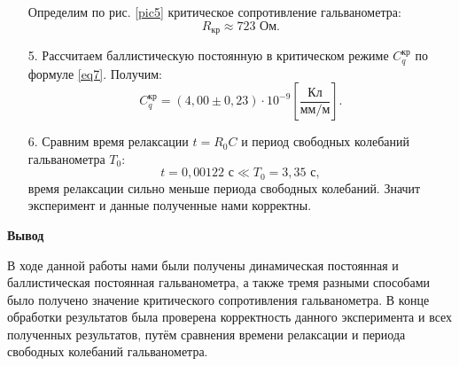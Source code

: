 \documentclass[a4paper, 12pt]{article}
\begin{document}
\begin{enumerate}
        \newpage
        
        Определим по рис. \ref{pic5} критическое сопротивление гальванометра:
        \begin{equation}
            R_{кр} \approx 723 \text{ Ом}.
        \end{equation}
        
        \item[5.] Рассчитаем баллистическую постоянную в критическом режиме $C^{кр}_q$ по формуле \eqref{eq7}. Получим:
        \begin{equation}
            C^{кр}_q = (4,00 \pm 0,23) \cdot 10^{-9} \left[ \frac{Кл}{мм/м} \right].
        \end{equation}
        
        
        \item[6.] Сравним время релаксации $t = R_0 C$ и период свободных колебаний гальванометра $T_0$:
        \begin{equation}
            t = 0,00122 \text{ с} \ll T_0 = 3,35 \text{ с},
        \end{equation}
        время релаксации сильно меньше периода свободных колебаний. Значит эксперимент и данные полученные нами корректны.
        
        
    \end{enumerate}
    
    \begin{flushleft}
        {\Large {\bf Вывод}}
    \end{flushleft}
    
    В ходе данной работы нами были получены динамическая постоянная и баллистическая постоянная гальванометра, а также тремя разными способами было получено значение критического сопротивления гальванометра. В конце обработки результатов была проверена корректность данного эксперимента и всех полученных результатов, путём сравнения времени релаксации и периода свободных колебаний гальванометра.
    
\end{document}
